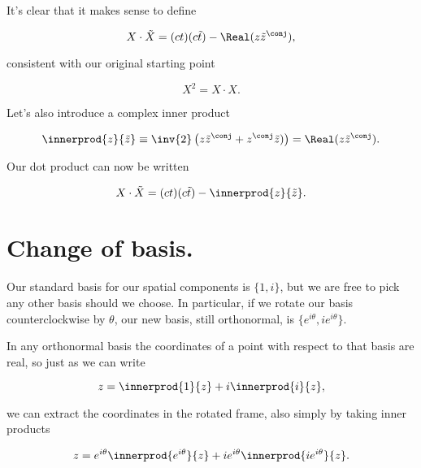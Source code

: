 It's clear that it makes sense to define

\begin{equation}\label{eqn:complexPlanarBoost:50}
X \cdot \tilde{X} = (ct) (c \tilde{t}) - \Real (z \tilde{z}^\conj),
\end{equation}

consistent with our original starting point

\begin{equation}\label{eqn:complexPlanarBoost:70}
X^2 = X \cdot X.
\end{equation}

Let's also introduce a complex inner product

\begin{equation}\label{eqn:complexPlanarBoost:90}
\innerprod{z}{\tilde{z}} \equiv \inv{2} \left( z \tilde{z}^\conj + z^\conj \tilde{z}) \right) = \Real (z \tilde{z}^\conj).
\end{equation}

Our dot product can now be written

\begin{equation}\label{eqn:complexPlanarBoost:110}
X \cdot \tilde{X} = (ct) (c \tilde{t}) - \innerprod{z}{\tilde{z}}.
\end{equation}

\section{Change of basis.}

Our standard basis for our spatial components is $\{1, i\}$, but we are free to pick any other basis should we choose.  In particular, if we rotate our basis counterclockwise by $\theta$, our new basis, still orthonormal, is $\{ e^{i\theta}, i e^{i\theta} \}$.

In any orthonormal basis the coordinates of a point with respect to that basis are real, so just as we can write

\begin{equation}\label{eqn:complexPlanarBoost:130}
z = \innerprod{1}{z} + i \innerprod{i}{z},
\end{equation}

we can extract the coordinates in the rotated frame, also simply by taking inner products

\begin{equation}\label{eqn:complexPlanarBoost:150}
z = e^{i \theta} \innerprod{e^{i \theta}}{z} + i e^{i\theta} \innerprod{i e^{i\theta} }{z}.
\end{equation}

